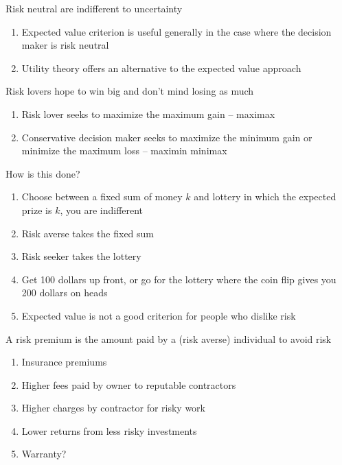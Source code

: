 \documentclass[aspectratio=1610,pdftex,dvipsnames,compress,xcolor={dvipsnames}]{beamer}
\begin{document}
\begin{frame}{Risk neutral are indifferent to uncertainty}
    \begin{enumerate}[series=outerlist,topsep=0pt,itemsep=21pt,leftmargin=*,label=(\arabic*)]
        \item[]Expected value criterion is useful generally in the case where the decision maker is risk neutral
        \item[]Utility theory offers an alternative to the expected value approach
    \end{enumerate}
\end{frame}


\begin{frame}{Risk lovers hope to win big and don’t mind losing as much}
    \begin{enumerate}[series=outerlist,topsep=0pt,itemsep=21pt,leftmargin=*,label=(\arabic*)]
        \item[]Risk lover seeks to maximize the maximum gain -- maximax
        \item[]Conservative decision maker seeks to maximize the minimum gain or minimize the maximum loss -- maximin minimax
    \end{enumerate}
\end{frame}


\begin{frame}{How is this done?}
    \begin{enumerate}[series=outerlist,topsep=0pt,itemsep=21pt,leftmargin=*,label=(\arabic*)]
        \item[]Choose between a fixed sum of money $k$ and lottery in which the expected prize is $k$, you are indifferent
        \item[]Risk averse takes the fixed sum
        \item[]Risk seeker takes the lottery
        \item[]Get 100 dollars up front, or go for the lottery where the coin flip gives you 200 dollars on heads
        \item[]Expected value is not a good criterion for people who dislike risk
    \end{enumerate}
\end{frame}


\begin{frame}{A risk premium is the amount paid by a (risk averse) individual to avoid risk}
    \begin{enumerate}[series=outerlist,topsep=0pt,itemsep=21pt,leftmargin=*,label=(\arabic*)]
        \item[]Insurance premiums
        \item[]Higher fees paid by owner to reputable contractors
        \item[]Higher charges by contractor for risky work
        \item[]Lower returns from less risky investments
        \item[]Warranty?
    \end{enumerate}
\end{frame}
\end{document}
